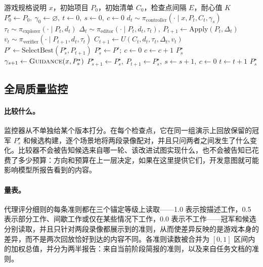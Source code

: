 \begin{algorithm}[h]
\caption{\rsig{} 递归游戏开发}
\label{alg:rsig}
\small
\begin{algorithmic}[1]
\Require 游戏规格说明 $x$，初始项目 $P_0$，初始清单 $C_0$，检查点间隔 $E$，耐心值 $K$
\State $P^\star_0 \gets P_0,\ \gamma_0 \gets \varnothing,\ t \gets 0,\ s \gets 0,\ c \gets 0$ 
  \State $d_t \sim \pi_{\mathrm{controller}}(\cdot \mid x, P_t, C_t, \gamma_s)$ 
  \State $\tau_t \sim \pi_{\mathrm{explorer}}(\cdot \mid P_t, d_t)$
  \State $\Delta_t \sim \pi_{\mathrm{editor}}(\cdot \mid P_t, d_t, \tau_t),\ P_{t+1} \gets \mathrm{Apply}(P_t, \Delta_t)$
  \State $v_t \sim \pi_{\mathrm{verifier}}(\cdot \mid P_{t+1}, d_t, \tau_t)$ 
  \State $C_{t+1} \gets U(C_t, d_t, \tau_t, \Delta_t, v_t)$ 
   
    \State $P' \gets \mathrm{SelectBest}(P^\star_s, P_{t+1})$
      \State $P^\star_s \gets P';\ c \gets 0$ 
    \Else
      \State $c \gets c + 1$ 
    \EndIf
     
       \Return $P^\star_s$ \EndIf
      \State $\gamma_{s+1} \gets \textsc{Guidance}(x, P^\star_s)$ 
      \State $P^\star_{s+1} \gets P^\star_s,\ P_{t+1} \gets P^\star_s,\ s \gets s+1,\ c \gets 0$ 
    \EndIf
  \EndIf
  \State $t \gets t + 1$
\EndWhile
\State \Return $P^\star_s$
\end{algorithmic}
\end{algorithm}

\subsection{全局质量监控}\label{app:monitor}
\paragraph{比较什么。}监控器从不单独给某个版本打分。在每个检查点，它在同一组演示上回放保留的冠军 $P^\star_s$ 和候选构建，逐个场景地将两段录像配对，并且只问两者之间发生了什么变化。比较器不会被告知候选来自哪一轮、该改进试图实现什么，也不会被告知已花费了多少预算：方向和预算在上一层决定，如果在这里提供它们，开发意图就可能影响模型所报告看到的内容。

\paragraph{量表。}代理评分细则的每条准则都在三个锚定等级上读取——1.0 表示按描述工作，0.5 表示部分工作、间歇工作或仅在某些情况下工作，0.0 表示不工作——冠军和候选分别读取，并且只针对两段录像都展示到的准则，从而使差异反映的是游戏本身的差异，而不是两次回放恰好到达的内容不同。各准则读数被合并为 $[0,1]$ 区间内的加权总值，并分为两半报告：来自当前阶段简报的准则，以及来自任务文档的准则。

